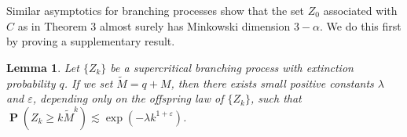 \documentclass[dvipsnames,letterpaper,12pt]{article}
\numberwithin{equation}{section}
\theoremstyle{plain}
\newtheorem{lemma}{Lemma}
\theoremstyle{remark}
\DeclareMathOperator{\Prob}{\mathbf{P}}
\begin{document}
Similar asymptotics for branching processes show that the set $Z_0$ associated with $C$ as in Theorem 3 almost surely has Minkowski dimension $3 - \alpha$. We do this first by proving a supplementary result.


\begin{lemma}\label{branchingtrick}
	Let $\{ Z_k \}$ be a supercritical branching process with extinction probability $q$. If we set $\tilde{M} = q + M$, then there exists small positive constants $\lambda$ and $\varepsilon$, depending only on the offspring law of $\{ Z_k \}$, such that $\Prob(Z_k \geq k \tilde{M}^k) \lesssim \exp \left(-\lambda k^{1 + \varepsilon} \right)$.
\end{lemma}
\end{document}
